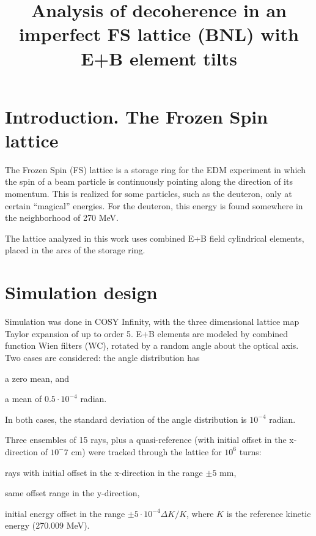\documentclass{article}
\begin{document}
\title{Analysis of decoherence in an imperfect FS lattice (BNL) with E+B element tilts}
\maketitle

\section{Introduction. The Frozen Spin lattice}

The Frozen Spin (FS) lattice is a storage ring for the EDM experiment in which the spin of a beam particle is continuously pointing along the direction of its momentum. This is realized for some particles, such as the deuteron, only at certain ``magical'' energies. For the deuteron, this energy is found somewhere in the neighborhood of 270 MeV.

The lattice analyzed in this work uses combined E+B field cylindrical elements, placed in the arcs of the storage ring. 

\section{Simulation design}
Simulation was done in COSY Infinity, with the three dimensional lattice map Taylor expansion of up to order 5. E+B elements are modeled by combined function Wien filters (WC), rotated by a random angle about the optical axis. Two cases are considered: the angle distribution has 
\begin{inparaenum}[1)]
\item a zero mean, and
\item a mean of $0.5\cdot 10^{-4}$ radian.
\end{inparaenum}
In both cases, the standard deviation of the angle distribution is $10^{-4}$ radian.

Three ensembles of 15 rays, plus a quasi-reference (with initial offset in the x-direction of $10^-7$ cm) were tracked through the lattice for $10^6$ turns:
\begin{inparaenum}[1)]
\item rays with initial offset in the x-direction in the range $\pm 5$ mm,
\item same offset range in the y-direction,
\item initial energy offset in the range $\pm 5\cdot 10^{-4} \Delta K/K$, where $K$ is the reference kinetic energy (270.009 MeV).
\end{inparaenum}
\end{document}
